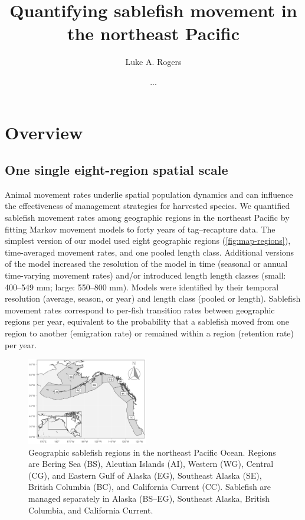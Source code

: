 \documentclass{article}
\title{Quantifying sablefish movement in the northeast Pacific}
\author[1]{Luke A. Rogers}
\author[]{...}
\affil[1]{Pacific Biological Station, Fisheries and Oceans Canada, Nanaimo, BC, V9T 6N7, Canada}
\begin{document}
\maketitle
\linenumbers
\setcounter{secnumdepth}{0} %

\section{Overview}
\subsection{One single eight-region spatial scale}
Animal movement rates underlie spatial population dynamics and can influence the effectiveness of management strategies for harvested species. We quantified sablefish movement rates among geographic regions in the northeast Pacific by fitting Markov movement models to forty years of tag--recapture data. The simplest version of our model used eight geographic regions (\autoref{fig:map-regions}), time-averaged movement rates, and one pooled length class. Additional versions of the model increased the resolution of the model in time (seasonal or annual time-varying movement rates) and/or introduced length length classes (small: 400--549 mm; large: 550--800 mm). Models were identified by their temporal resolution (average, season, or year) and length class (pooled or length). Sablefish movement rates correspond to per-fish transition rates between geographic regions per year, equivalent to the probability that a sablefish moved from one region to another (emigration rate) or remained within a region (retention rate) per year.  

\begin{figure}[htb]
    \centering
    \includegraphics[width = 0.47\textwidth]{map-regions}
    \caption{Geographic sablefish regions in the northeast Pacific Ocean. Regions are Bering Sea (BS), Aleutian Islands (AI), Western (WG), Central (CG), and Eastern Gulf of Alaska (EG), Southeast Alaska (SE), British Columbia (BC), and California Current (CC). Sablefish are managed separately in Alaska (BS--EG), Southeast Alaska, British Columbia, and California Current.}
    \label{fig:map-regions}
\end{figure}
\end{document}
